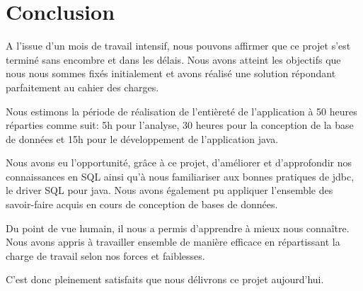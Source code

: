 \documentclass[11pt,a4paper]{report}
\begin{document}
\chapter{Conclusion}
\begin{flushleft}
A l’issue d’un mois de travail intensif, nous pouvons affirmer que ce projet s’est terminé sans encombre et dans les délais.
Nous avons atteint les objectifs que nous nous sommes fixés initialement et avons réalisé une solution répondant parfaitement au cahier des charges.
\par

Nous estimons la période de réalisation de l’entièreté de l’application à 50 heures réparties comme suit:
5h pour l’analyse, 30 heures pour la conception de la base de données et 15h pour le développement de l’application java.
\par

Nous avons eu l’opportunité, grâce à ce projet, d’améliorer et d’approfondir nos connaissances en SQL ainsi qu’à nous familiariser aux bonnes pratiques de jdbc, le driver SQL pour java.
Nous avons également pu appliquer l’ensemble des savoir-faire acquis en cours de conception de bases de données.
\par

Du point de vue humain, il nous a permis d’apprendre à mieux nous connaître.
Nous avons appris à travailler ensemble de manière efficace en répartissant la charge de travail selon nos forces et faiblesses.
\par

C’est donc pleinement satisfaits que nous délivrons ce projet aujourd’hui.
\end{flushleft}
\end{document}
